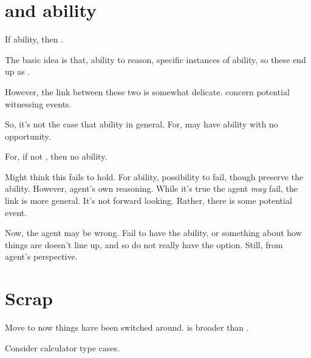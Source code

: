 \section{ and ability}
\label{sec:fc3-ability}

\begin{note}
  If \abgen{} ability, then .

  The basic idea is that, \abgen{} ability to reason, specific instances of \abgen{} ability, so these end up as .

  However, the link between these two is somewhat delicate.
   concern potential witnessing events.

  So, it's not the case that ability in general.
  For, may have ability with no opportunity.

  For, if not \fc{}, then no ability.

  Might think this fails to hold.
  For ability, possibility to fail, though preserve the ability.
  However, agent's own reasoning.
  While it's true the agent \emph{may} fail, the link is more general.
  It's not forward looking.
  Rather, there is some potential event.

  Now, the agent may be wrong.
  Fail to have the ability, or something about how things are doesn't line up, and so do not really have the option.
  Still, from agent's perspective.
\end{note}

\section{Scrap}

\begin{note}
  {
    \color{red}
    Move to \requ{} now things have been switched around.
  }
  \fc{} is broader than \requ{}.

  Consider calculator type cases.
\end{note}


